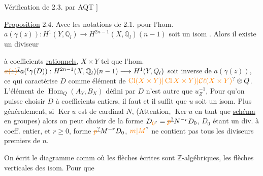 Vérification de 2.3. par AQT $]$

\uline{Proposition} 2.4. Avec les notations de 2.1.  pour  l'hom. $a(\gamma(z)):\allowbreak H^1(Y,\mathbb Q_l)\longrightarrow H^{2n-1}(X,\mathbb Q_l)(n-1)$ soit un isom  . Alors il existe un diviseur

 à coefficients \uline{rationnels},  $X\times Y$ tel que l'hom. $\deleted{\unsure{a(z)}}a({}^t\gamma(D)):H^{2n-1}(X,\mathbb Q_l)(n-1)\longrightarrow H^1(Y,Q_l)$ soit inverse de $a(\gamma(z))$, ce qui caractérise $D$ comme élément de $\unsure{\operatorname{Cl}(X\times Y)|\operatorname{Cl}X\times Y)|\mathcal C\ell(X\times Y)}\otimes Q$. L'élément de $\operatorname{Hom}_{Q}(A_Y,B_X)$ défini par $D$ n'est autre que $u_Z^{-1}$,  Pour qu'on puisse choisir $D$ à coefficients entiers, il faut et il suffit que $u$ soit un isom.  Plus généralement, si $\operatorname{Ker}u$ est de cardinal $N$,  (Attention, $\operatorname{Ker}u$ en tant que \uline{schéma} en groupes) alors on peut choisir  de la forme $D_{\unsure{0}}=\deleted{\unsure{p}}N^{-r}D_0$, $D_0$ étant un div. à coeff. entier, et $r\geq0$,  forme $\deleted{\unsure{p}}M^{-r}D_0$,  $\unsure{m|M}$ ne contient pas tous les diviseurs premiers de $n$.

On écrit le diagramme comm
où  les flèches écrites sont $\mathbb Z$-algébriques, les flèches verticales des isom.  Pour que

